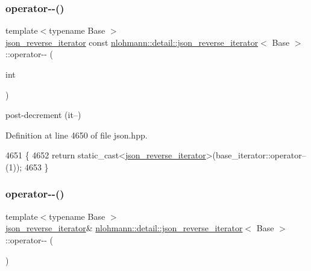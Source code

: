 \subsubsection{\texorpdfstring{operator-\/-\/()}{operator--()}\hspace{0.1cm}{\footnotesize\ttfamily [1/2]}}
{\footnotesize\ttfamily template$<$typename Base $>$ \\
\hyperlink{classnlohmann_1_1detail_1_1json__reverse__iterator}{json\+\_\+reverse\+\_\+iterator} const \hyperlink{classnlohmann_1_1detail_1_1json__reverse__iterator}{nlohmann\+::detail\+::json\+\_\+reverse\+\_\+iterator}$<$ Base $>$\+::operator-\/-\/ (\begin{DoxyParamCaption}\item[{int}]{ }\end{DoxyParamCaption})\hspace{0.3cm}{\ttfamily [inline]}}



post-\/decrement (it--) 



Definition at line 4650 of file json.\+hpp.


\begin{DoxyCode}
4651     \{
4652         \textcolor{keywordflow}{return} \textcolor{keyword}{static\_cast<}\hyperlink{classnlohmann_1_1detail_1_1json__reverse__iterator_a0246de16ece16293f2917dfa5d96e278}{json\_reverse\_iterator}\textcolor{keyword}{>}(base\_iterator::operator--(1));
4653     \}
\end{DoxyCode}
\mbox{\label{classnlohmann_1_1detail_1_1json__reverse__iterator_a2488d6a902103610943920ac49d12a04}} 
\subsubsection{\texorpdfstring{operator-\/-\/()}{operator--()}\hspace{0.1cm}{\footnotesize\ttfamily [2/2]}}
{\footnotesize\ttfamily template$<$typename Base $>$ \\
\hyperlink{classnlohmann_1_1detail_1_1json__reverse__iterator}{json\+\_\+reverse\+\_\+iterator}\& \hyperlink{classnlohmann_1_1detail_1_1json__reverse__iterator}{nlohmann\+::detail\+::json\+\_\+reverse\+\_\+iterator}$<$ Base $>$\+::operator-\/-\/ (\begin{DoxyParamCaption}{ }\end{DoxyParamCaption})\hspace{0.3cm}{\ttfamily [inline]}}




